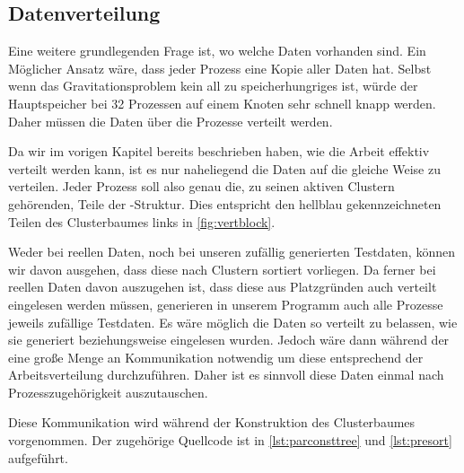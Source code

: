     \clearpage
  
  \subsection{Datenverteilung}
  \label{sec:data}
    
    Eine weitere grundlegenden Frage ist, wo welche Daten vorhanden sind. Ein Möglicher Ansatz wäre, dass jeder Prozess eine Kopie aller Daten hat. Selbst wenn das Gravitationsproblem kein all
    zu speicherhungriges ist, würde der Hauptspeicher bei 32 Prozessen auf einem Knoten sehr schnell knapp werden. Daher müssen die Daten über die Prozesse verteilt werden. 
    
    Da wir im vorigen Kapitel bereits beschrieben haben, wie die Arbeit effektiv verteilt werden kann, ist es nur naheliegend die Daten auf die gleiche Weise zu verteilen. Jeder Prozess soll also 
    genau die, zu seinen aktiven Clustern gehörenden, Teile der -Struktur. Dies entspricht den hellblau gekennzeichneten Teilen des Clusterbaumes links in \autoref{fig:vertblock}.
    
    Weder bei reellen Daten, noch bei unseren zufällig generierten Testdaten, können wir davon ausgehen, dass diese nach Clustern sortiert vorliegen. Da ferner bei reellen Daten davon auszugehen
    ist, dass diese aus Platzgründen auch verteilt eingelesen werden müssen, generieren in unserem Programm auch alle Prozesse jeweils zufällige Testdaten. Es wäre möglich die Daten so verteilt
    zu belassen, wie sie generiert beziehungsweise eingelesen wurden. Jedoch wäre dann während der \vorruck  eine große Menge an Kommunikation notwendig um diese entsprechend der Arbeitsverteilung
    durchzuführen. Daher ist es sinnvoll diese Daten einmal nach Prozesszugehörigkeit auszutauschen.
    
    Diese Kommunikation wird während der Konstruktion des Clusterbaumes vorgenommen. Der zugehörige Quellcode ist in \autoref{lst:parconsttree} und \autoref{lst:presort} aufgeführt. 